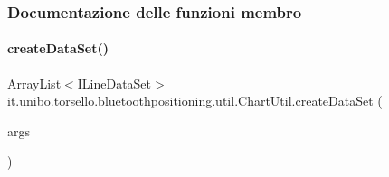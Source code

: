 \subsubsection{Documentazione delle funzioni membro}
\hypertarget{classit_1_1unibo_1_1torsello_1_1bluetoothpositioning_1_1util_1_1ChartUtil_a40268790f1c3f7ec34bd4296166048b4_a40268790f1c3f7ec34bd4296166048b4}{}\label{classit_1_1unibo_1_1torsello_1_1bluetoothpositioning_1_1util_1_1ChartUtil_a40268790f1c3f7ec34bd4296166048b4_a40268790f1c3f7ec34bd4296166048b4} 
\paragraph{\texorpdfstring{create\+Data\+Set()}{createDataSet()}\hspace{0.1cm}{\footnotesize\ttfamily [1/2]}}
{\footnotesize\ttfamily Array\+List$<$I\+Line\+Data\+Set$>$ it.\+unibo.\+torsello.\+bluetoothpositioning.\+util.\+Chart\+Util.\+create\+Data\+Set (\begin{DoxyParamCaption}\item[{Array\+List$<$ String $>$}]{args }\end{DoxyParamCaption})}


